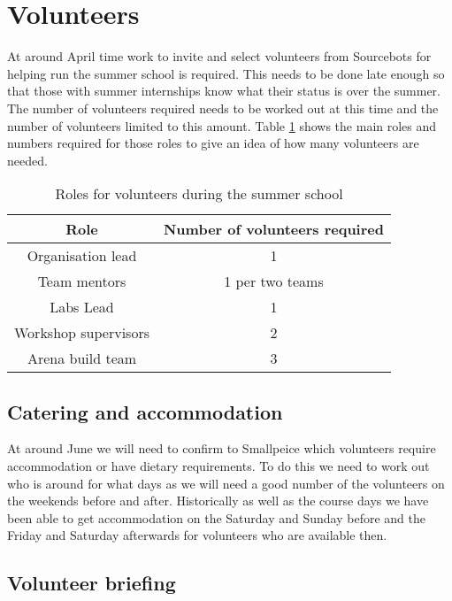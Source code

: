 \section{Volunteers}

At around April time work to invite and select volunteers from Sourcebots for helping run the summer school is required.
This needs to be done late enough so that those with summer internships know what their status is over the summer.
The number of volunteers required needs to be worked out at this time and the number of volunteers limited to this amount.
Table \ref{tab:volunteerroles} shows the main roles and numbers required for those roles to give an idea of how many volunteers are needed.

\begin{table}
    \centering
    \begin{tabular}{cc}
        Role & Number of volunteers required \\
        \hline
        Organisation lead & 1 \\
        Team mentors & 1 per two teams \\
        Labs Lead & 1 \\
        Workshop supervisors & 2 \\
        Arena build team & 3\\
    \end{tabular}
    \caption{Roles for volunteers during the summer school}
    \label{tab:volunteerroles}
\end{table}



\subsection{Catering and accommodation}

At around June we will need to confirm to Smallpeice which volunteers require accommodation or have dietary requirements.
To do this we need to work out who is around for what days as we will need a good number of the volunteers on the weekends before and after.
Historically as well as the course days we have been able to get accommodation on the Saturday and Sunday before and the Friday and Saturday afterwards for volunteers who are available then.


\subsection{Volunteer briefing}

